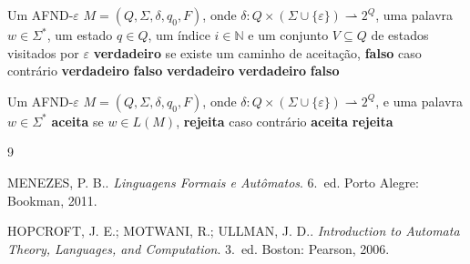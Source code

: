 \documentclass[12pt, a4paper]{article}
\theoremstyle{definition}
\theoremstyle{plain}
\theoremstyle{remark}
\begin{document}
\begin{algorithm}[H]
  \caption{$\textsc{Busca}(M, w, q, i, V)$}
  \label{alg:afndEpsBusca}
  \begin{algorithmic}[1]
    \Require Um AFND-$\varepsilon$ $M = (Q, \Sigma, \delta, q_0, F)$,
             onde $\delta : Q \times (\Sigma \cup \{\varepsilon\}) \rightharpoonup 2^{Q}$,
             uma palavra $w \in \Sigma^*$,
             um estado $q \in Q$,
             um índice $i \in \mathbb{N}$ e
             um conjunto $V \subseteq Q$ de estados visitados por $\varepsilon$
    \Ensure  \textbf{verdadeiro} se existe um caminho de aceitação,
             \textbf{falso} caso contrário
        \State \Return \textbf{verdadeiro}
      \Else
        \State \Return \textbf{falso}
      \EndIf
    \EndIf
        \State \Return \textbf{verdadeiro}
      \EndIf
    \EndFor
        \State \Return \textbf{verdadeiro}
      \EndIf
    \EndFor
    \State \Return \textbf{falso}
  \end{algorithmic}
\end{algorithm}

\begin{algorithm}[H]
  \caption{Simulação de um AFND-$\varepsilon$ com Backtracking}
  \label{alg:afndEpsBacktracking}
  \begin{algorithmic}[1]
    \Require Um AFND-$\varepsilon$ $M = (Q, \Sigma, \delta, q_0, F)$,
             onde $\delta : Q \times (\Sigma \cup \{\varepsilon\}) \rightharpoonup 2^{Q}$,
             e uma palavra $w \in \Sigma^*$
    \Ensure  \textbf{aceita} se $w \in L(M)$, \textbf{rejeita} caso contrário
      \State \Return \textbf{aceita}
    \Else
      \State \Return \textbf{rejeita}
    \EndIf
  \end{algorithmic}
\end{algorithm}
\newpage
\begin{thebibliography}{9}

MENEZES, P. B.\@.
\textit{Linguagens Formais e Autômatos}.
6.~ed. Porto Alegre: Bookman, 2011.

HOPCROFT, J. E.; MOTWANI, R.; ULLMAN, J. D.\@.
\textit{Introduction to Automata Theory, Languages, and Computation}.
3.~ed. Boston: Pearson, 2006.

\end{thebibliography}
\end{document}
